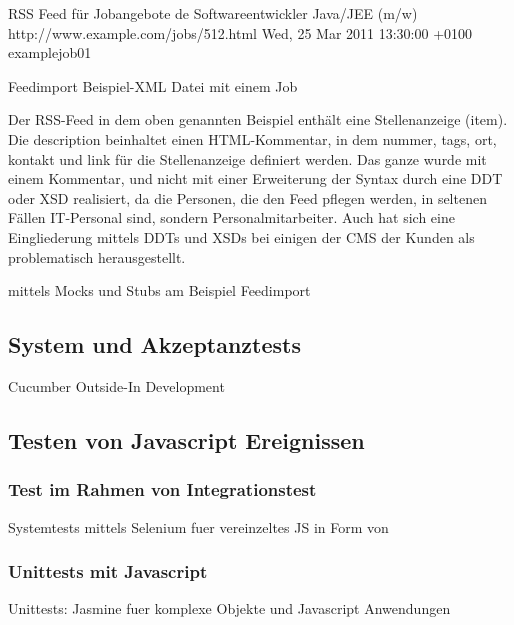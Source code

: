\begin{ruby}[label=beispiel\_job.xml, fontsize=\relsize{-2}]
 
    RSS Feed für Jobangebote 
    de
      Softwareentwickler Java/JEE (m/w)
        \PY{c+cp}{<![CDATA[}
\PY{c+cp}{        ]]>}
      http://www.example.com/jobs/512.html
      Wed, 25 Mar 2011 13:30:00 +0100
      example\PYZus{}job\PYZus{}01
\end{ruby}
\captionsetup{type=lstlisting}
\caption{Feedimport Beispiel-XML Datei mit einem Job}
Der RSS-Feed in dem oben genannten Beispiel enthält eine Stellenanzeige (item). Die description beinhaltet einen HTML-Kommentar, in dem nummer, tags, ort, kontakt und link für die Stellenanzeige definiert werden. Das ganze wurde mit einem Kommentar, und nicht mit einer Erweiterung der Syntax durch eine DDT oder XSD realisiert, da die Personen, die den Feed pflegen werden, in seltenen Fällen IT-Personal sind, sondern Personalmitarbeiter. Auch hat sich eine Eingliederung mittels DDTs und XSDs bei einigen der CMS der Kunden als problematisch herausgestellt.



 
 
 mittels Mocks und Stubs am Beispiel Feedimport

\subsection{System und Akzeptanztests}
Cucumber Outside-In Development


\subsection{Testen von Javascript Ereignissen}
\subsubsection{Test im Rahmen von Integrationstest}
Systemtests mittels Selenium fuer vereinzeltes JS in Form von

\subsubsection{Unittests mit Javascript}
Unittests:  Jasmine fuer komplexe Objekte und Javascript Anwendungen







